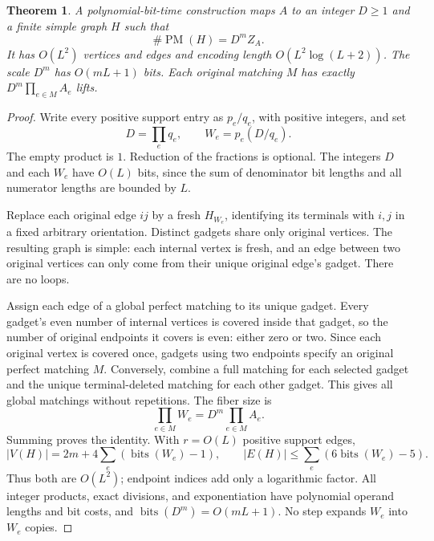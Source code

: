\documentclass[11pt]{article}
\newtheorem{theorem}{Theorem}
\newcommand{\PM}{\operatorname{PM}}
\newcommand{\bits}{\operatorname{bits}}
\begin{document}
\begin{theorem}\label{thm:reduction}
A polynomial-bit-time construction maps $A$ to an integer $D\ge1$ and a finite simple graph $H$ such that
\[
 \#\PM(H)=D^m Z_A.
\]
It has $O(L^2)$ vertices and edges and encoding length $O(L^2\log(L+2))$. The scale $D^m$ has $O(mL+1)$ bits. Each original matching $M$ has exactly $D^m\prod_{e\in M}A_e$ lifts.
\end{theorem}
\begin{proof}
Write every positive support entry as $p_e/q_e$, with positive integers, and set
\[
 D=\prod_e q_e,\qquad W_e=p_e(D/q_e).
\]
The empty product is $1$. Reduction of the fractions is optional. The integers $D$ and each $W_e$ have $O(L)$ bits, since the sum of denominator bit lengths and all numerator lengths are bounded by $L$.

Replace each original edge $ij$ by a fresh $H_{W_e}$, identifying its terminals with $i,j$ in a fixed arbitrary orientation. Distinct gadgets share only original vertices. The resulting graph is simple: each internal vertex is fresh, and an edge between two original vertices can only come from their unique original edge's gadget. There are no loops.

Assign each edge of a global perfect matching to its unique gadget. Every gadget's even number of internal vertices is covered inside that gadget, so the number of original endpoints it covers is even: either zero or two. Since each original vertex is covered once, gadgets using two endpoints specify an original perfect matching $M$. Conversely, combine a full matching for each selected gadget and the unique terminal-deleted matching for each other gadget. This gives all global matchings without repetitions. The fiber size is
\[
 \prod_{e\in M}W_e=D^m\prod_{e\in M}A_e.
\]
Summing proves the identity. With $r=O(L)$ positive support edges,
\[
 |V(H)|=2m+4\sum_e(\bits(W_e)-1),\qquad
 |E(H)|\le\sum_e(6\bits(W_e)-5).
\]
Thus both are $O(L^2)$; endpoint indices add only a logarithmic factor. All integer products, exact divisions, and exponentiation have polynomial operand lengths and bit costs, and $\bits(D^m)=O(mL+1)$. No step expands $W_e$ into $W_e$ copies.
\end{proof}
\end{document}
